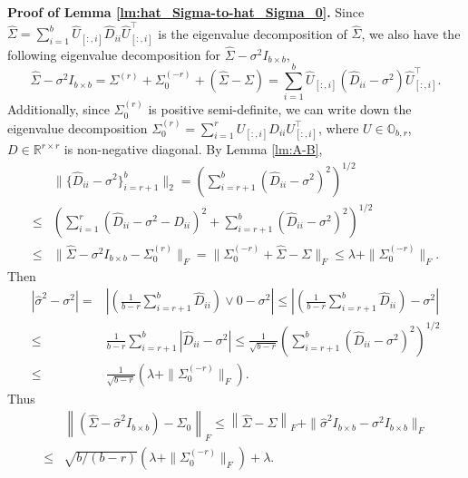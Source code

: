 \documentclass[11pt]{article}
\newcommand{\0}{{\mathbf{0}}}
\newcommand{\1}{{\mathbf{1}}}
\begin{document}
{\noindent\bf Proof of Lemma \ref{lm:hat_Sigma-to-hat_Sigma_0}.} 
Since $\hat{\Sigma}=\sum_{i=1}^b\hat{U}_{[:, i]}\hat{D}_{ii}\hat{U}_{[:, i]}^\top$ is the eigenvalue decomposition of $\hat{\Sigma}$, we also have the following eigenvalue decomposition for $\hat{\Sigma} - \sigma^2I_{b\times b}$,
\begin{equation*}
\hat{\Sigma} - \sigma^2 I_{b\times b} = \Sigma^{(r)} + \Sigma_0^{(-r)} + (\hat{\Sigma} - \Sigma) = \sum_{i=1}^{b}\hat{U}_{[:, i]}(\hat{D}_{ii}-\sigma^2)\hat{U}_{[:, i]}^\top.
\end{equation*}
Additionally, since $\Sigma_0^{(r)}$ is positive semi-definite, we can write down the eigenvalue decomposition $\Sigma_0^{(r)} = \sum_{i=1}^r U_{[:, i]}D_{ii}U_{[:, i]}^\top$, where $U\in \mathbb{O}_{b, r}$, $D\in \mathbb{R}^{r\times r}$ is non-negative diagonal. By Lemma \ref{lm:A-B}, 
\begin{equation}\label{ineq:hat-D-ii-sigma^2}
\begin{split}
& \|\{\hat{D}_{ii} - \sigma^2\}_{i=r+1}^b\|_2 = \left(\sum_{i=r+1}^b \left(\hat{D}_{ii}-\sigma^2\right)^2\right)^{1/2} \\
\leq & \left(\sum_{i=1}^r (\hat{D}_{ii} - \sigma^2 - D_{ii})^2 + \sum_{i=r+1}^b (\hat{D}_{ii}-\sigma^2)^2\right)^{1/2}\\
\leq & \|\hat{\Sigma}-\sigma^2I_{b\times b}-\Sigma_0^{(r)}\|_F = \|\Sigma_0^{(-r)} + \hat\Sigma - \Sigma \|_F \leq \lambda + \|\Sigma_0^{(-r)}\|_F.
\end{split}
\end{equation}
Then
\begin{equation}\label{ineq:lm-hat-sigma0-1}
\begin{split}
\left|\hat\sigma^2 - \sigma^2 \right| = & \left|\left(\frac{1}{b-r}\sum_{i=r+1}^b \hat{D}_{ii}\right)\vee 0 - \sigma^2 \right| \leq \left|\left(\frac{1}{b-r}\sum_{i=r+1}^b \hat{D}_{ii}\right) - \sigma^2 \right|\\
\leq & \frac{1}{b-r} \sum_{i=r+1}^b\left|\hat{D}_{ii} - \sigma^2\right|\leq \frac{1}{\sqrt{b-r}} \left(\sum_{i=r+1}^b(\hat{D}_{ii}-\sigma^2)^2\right)^{1/2} \\
\leq & \frac{1}{\sqrt{b-r}}\left(\lambda + \|\Sigma_0^{(-r)}\|_F\right).
\end{split}
\end{equation}
Thus 
\begin{equation}\label{ineq:lm-hat-sigma0-2}
\begin{split}
& \left\|(\hat{\Sigma} - \hat{\sigma}^2I_{b\times b}) - \Sigma_0 \right\|_F \leq \left\|\hat{\Sigma} - \Sigma\right\|_F + \|\hat{\sigma}^2I_{b\times b} - \sigma^2I_{b\times b}\|_F \\
\leq & \sqrt{b/(b-r)}\left(\lambda + \|\Sigma_0^{(-r)}\|_F\right) + \lambda.
\end{split}
\end{equation}
\end{document}
